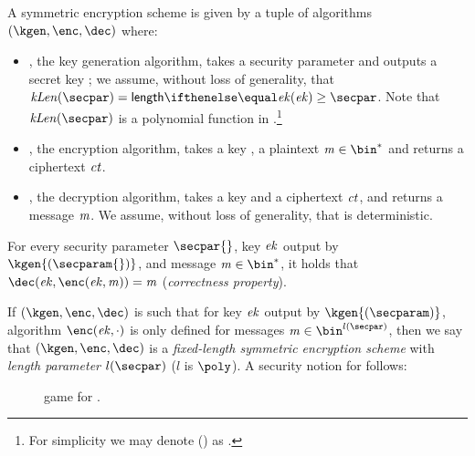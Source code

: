 \begin{definition}
    A symmetric encryption scheme \sym{} is given by a tuple of \ppt{} algorithms $(\kgen,\enc, \dec)$ where:
\begin{itemize}
    \item \kgen{}, the key generation algorithm, takes a security parameter \secparam{} and outputs a secret key \ek; we assume, without loss of generality, that $\symKeyLen (\secpar) = \len{\ek}\geq \secpar$. Note that $\symKeyLen(\secpar)$ is a polynomial function in \secpar.\footnote{For simplicity we may denote \symKeyLen(\secpar) as \symKeyLen{}.}
    \item \enc{}, the encryption algorithm, takes a key \ek{}, a plaintext $\msg\in\bin^{*}$ and returns a ciphertext $\mathit{ct}$.
    \item \dec{}, the decryption algorithm, takes a key \ek{} and a ciphertext $\mathit{ct}$, and returns a message $\mathit{m}$. We assume, without loss of generality, that \dec{} is deterministic.
\end{itemize}
    For every security parameter $\secpar{}$, key $\mathit{ek}$ output by $\kgen{(\secparam{})}$, and message $\msg \in \bin^{*}$, it holds that $\dec(\ek, \enc(\ek, \msg)) = \msg$ (\emph{correctness property}).
\end{definition}

If $(\kgen,\enc, \dec)$ is such that for key $\mathit{ek}$ output by $\kgen{(\secparam)}$, algorithm $\enc(\ek, \cdot)$ is only defined for messages $\msg\in\bin^{l(\secpar)}$, then we say that $(\kgen,\enc, \dec)$ is a \emph{fixed-length symmetric encryption scheme} with \emph{length parameter} $l(\secpar)$ ($l$ is $\poly$). A security notion for \sym{} follows:

\begin{figure}[h!]
    \centering
    \caption{\indcpa{} game for \sym.}\label{fig:indcpa}
\end{figure}

